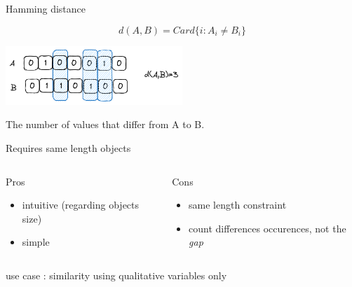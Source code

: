 \documentclass{beamer}
\begin{document}
\begin{frame}{Hamming distance}

$$d(A,B)= Card\{i : A_i \neq B_i\}$$

\begin{center}
\includegraphics[width=0.5\textwidth,keepaspectratio]{img/hamming.png}
\end{center}

The number of values that differ from A to B.


Requires \alert{same length} objects


\begin{scriptsize}
\begin{columns}[T,onlytextwidth]
\begin{block}{Pros}
\begin{itemize}
  \item intuitive (regarding objects size)
  \item simple 
\end{itemize}
\end{block}
\begin{block}{Cons}
\begin{spacing}{0.9}
\begin{itemize}
  \item same length constraint
  \item count differences occurences, not the \textit{gap}  
\end{itemize}
\end{spacing}
\end{block}
\end{columns}
\end{scriptsize}

use case : similarity using qualitative variables only

\end{frame}
\end{document}
